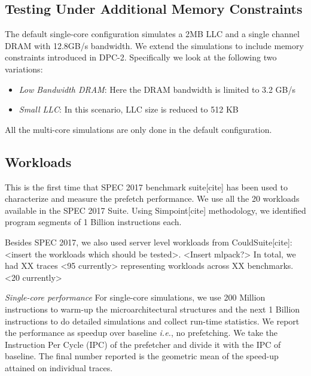 \documentclass{sig-alternate}
\begin{document}
\subsection{Testing Under Additional Memory Constraints}
The default single-core configuration simulates a 2MB LLC and a single channel DRAM with 12.8GB/s bandwidth. We extend the simulations to include memory constraints introduced in DPC-2. Specifically we look at the following two variations:
\begin{itemize}
    \item \textit{Low Bandwidth DRAM}: Here the DRAM bandwidth is limited to 3.2 GB/s
    \item \textit{Small LLC}: In this scenario, LLC size is reduced to 512 KB
\end{itemize}
All the multi-core simulations are only done in the default configuration.

\subsection{Workloads}
This is the first time that SPEC 2017 benchmark suite[cite] has been used to characterize and measure the prefetch performance. We use all the 20 workloads available in the SPEC 2017 Suite. Using Simpoint[cite] methodology, we identified program segments of 1 Billion instructions each.

Besides SPEC 2017, we also used server level workloads from CouldSuite[cite]: <insert the workloads which should be tested>. <Insert mlpack?> In total, we had XX traces <95 currently> representing workloads across XX benchmarks. <20 currently>

\textit{Single-core performance} For single-core simulations, we use 200 Million instructions to warm-up the microarchitectural structures and the next 1 Billion instructions to do detailed simulations and collect run-time statistics. We report the performance as speedup over baseline \textit{i.e.}, no prefetching. We take the Instruction Per Cycle (IPC) of the prefetcher and divide it with the IPC of baseline. The final number reported is the geometric mean of the speed-up attained on individual traces.
\end{document}

